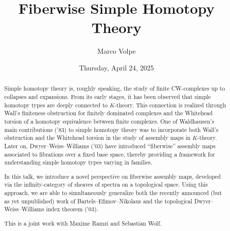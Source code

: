 \documentclass{UAmathtalk}
\author{Marco Volpe}
\title{Fiberwise Simple Homotopy Theory}
\date{Thursday, April 24, 2025}
\begin{document}
\maketitle

\begin{abstract}
Simple homotopy theory is, roughly speaking, the study of finite CW-complexes up to collapses and expansions. From its early stages, it has been observed that simple homotopy types are deeply connected to $K$-theory. This connection is realized through Wall’s finiteness obstruction for finitely dominated complexes and the Whitehead torsion of a homotopy equivalence between finite complexes. One of Waldhausen’s main contributions (’83) to simple homotopy theory was to incorporate both Wall’s obstruction and the Whitehead torsion in the study of assembly maps in $K$-theory. Later on, Dwyer–Weiss–Williams (’03) have introduced “fiberwise” assembly maps associated to fibrations over a fixed base space, thereby providing a framework for understanding simple homotopy types varying in families.

In this talk, we introduce a novel perspective on fiberwise assembly maps, developed via the infinity-category of sheaves of spectra on a topological space. Using this approach, we are able to simultaneously generalize both the recently announced (but as yet unpublished) work of Bartels–Efimov–Nikolaus and the topological Dwyer–Weiss–Williams index theorem (’03).

This is a joint work with Maxime Ramzi and Sebastian Wolf.
\end{abstract}
\end{document}
